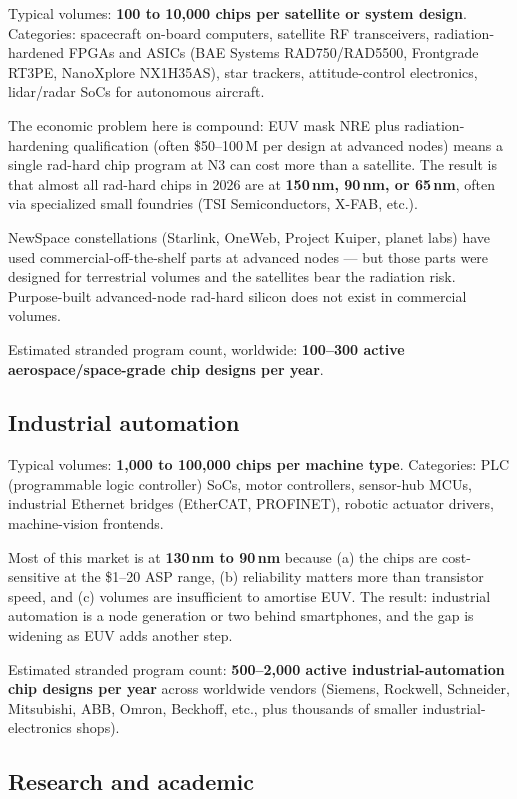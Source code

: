 \documentclass[11pt,letterpaper]{article}
\begin{document}
Typical volumes: \textbf{100 to 10{,}000 chips per satellite or system design}. Categories: spacecraft on-board computers, satellite RF transceivers, radiation-hardened FPGAs and ASICs (BAE Systems RAD750/RAD5500, Frontgrade RT3PE, NanoXplore NX1H35AS), star trackers, attitude-control electronics, lidar/radar SoCs for autonomous aircraft.

The economic problem here is compound: EUV mask NRE plus radiation-hardening qualification (often \$50--100\,M per design at advanced nodes) means a single rad-hard chip program at N3 can cost more than a satellite. The result is that almost all rad-hard chips in 2026 are at \textbf{150\,nm, 90\,nm, or 65\,nm}, often via specialized small foundries (TSI Semiconductors, X-FAB, etc.).

NewSpace constellations (Starlink, OneWeb, Project Kuiper, planet labs) have used commercial-off-the-shelf parts at advanced nodes --- but those parts were designed for terrestrial volumes and the satellites bear the radiation risk. Purpose-built advanced-node rad-hard silicon does not exist in commercial volumes.

Estimated stranded program count, worldwide: \textbf{100--300 active aerospace/space-grade chip designs per year}.

\subsection{Industrial automation}

Typical volumes: \textbf{1{,}000 to 100{,}000 chips per machine type}. Categories: PLC (programmable logic controller) SoCs, motor controllers, sensor-hub MCUs, industrial Ethernet bridges (EtherCAT, PROFINET), robotic actuator drivers, machine-vision frontends.

Most of this market is at \textbf{130\,nm to 90\,nm} because (a) the chips are cost-sensitive at the \$1--20 ASP range, (b) reliability matters more than transistor speed, and (c) volumes are insufficient to amortise EUV. The result: industrial automation is a node generation or two behind smartphones, and the gap is widening as EUV adds another step.

Estimated stranded program count: \textbf{500--2{,}000 active industrial-automation chip designs per year} across worldwide vendors (Siemens, Rockwell, Schneider, Mitsubishi, ABB, Omron, Beckhoff, etc., plus thousands of smaller industrial-electronics shops).

\subsection{Research and academic}
\end{document}
